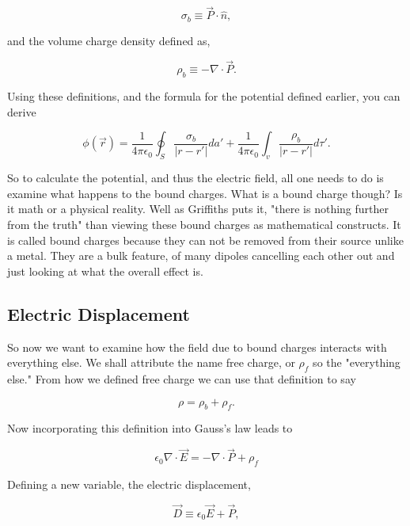 \documentclass[preprint, review,12pt]{elsarticle}
\begin{document}
\begin{equation}
    \sigma_b \equiv \vec{P} \cdot \hat{n},
\end{equation}

and the volume charge density defined as,

\begin{equation}
    \rho_b \equiv - \nabla \cdot \vec{P}.
\end{equation}

Using these definitions, and the formula for the potential defined earlier, you can derive

\begin{equation}
    \phi(\vec{r}) = \frac{1}{4\pi \epsilon_0}\oint_S \frac{\sigma_b}{|r-r'|}da' + \frac{1}{4\pi \epsilon_0} \int_v \frac{\rho_b}{|r-r'|}d\tau'.
\end{equation}

So to calculate the potential, and thus the electric field, all one needs to do is examine what happens to the bound charges. What is a bound charge though? Is it math or a physical reality. Well as Griffiths puts it, "there is nothing further from the truth" than viewing these bound charges as mathematical constructs. It is called bound charges because they can not be removed from their source unlike a metal. They are a bulk feature, of many dipoles cancelling each other out and just looking at what the overall effect is. 

\subsection{Electric Displacement}

So now we want to examine how the field due to bound charges interacts with everything else. We shall attribute the name free charge, or $\rho_f$ so the "everything else." From how we defined free charge we can use that definition to say

\begin{equation}
    \rho = \rho_b + \rho_f.
\end{equation}

Now incorporating this definition into Gauss's law leads to

\begin{equation}
    \epsilon_0 \nabla \cdot \vec{E} = - \nabla \cdot \vec{P} + \rho_f
\end{equation}

Defining a new variable, the electric displacement,

\begin{equation}
    \vec{D} \equiv \epsilon_0 \vec{E} + \vec{P},
\end{equation}
\end{document}

